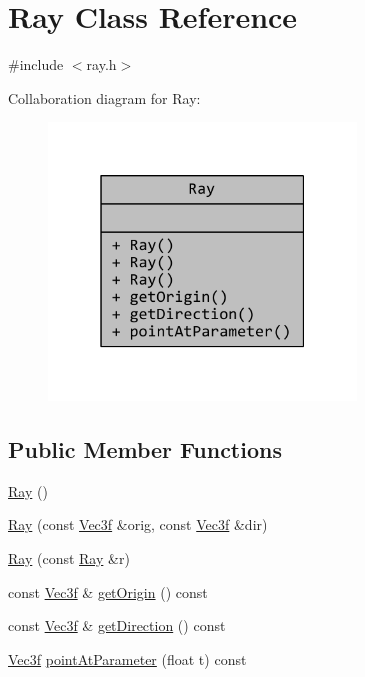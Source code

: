 \hypertarget{classRay}{\section{Ray Class Reference}
\label{classRay}
}


{\ttfamily \#include $<$ray.\+h$>$}



Collaboration diagram for Ray\+:
\nopagebreak
\begin{figure}[H]
\begin{center}
\leavevmode
\includegraphics[width=232pt]{classRay__coll__graph}
\end{center}
\end{figure}
\subsection*{Public Member Functions}
\begin{DoxyCompactItemize}
\item 
\hyperlink{classRay_a2e3d2c29f2df4ab3da10da79d4acb852}{Ray} ()
\item 
\hyperlink{classRay_a3f5131016c3a436018e0f37872e887ed}{Ray} (const \hyperlink{classVec3f}{Vec3f} \&orig, const \hyperlink{classVec3f}{Vec3f} \&dir)
\item 
\hyperlink{classRay_a42a3c560d1a0b25412c220025d4f0a94}{Ray} (const \hyperlink{classRay}{Ray} \&r)
\item 
const \hyperlink{classVec3f}{Vec3f} \& \hyperlink{classRay_ad00358184e1d27e1f92ddb10e6d8c5fb}{get\+Origin} () const 
\item 
const \hyperlink{classVec3f}{Vec3f} \& \hyperlink{classRay_a68698a8b94ab05f42ead9f4a89d320f7}{get\+Direction} () const 
\item 
\hyperlink{classVec3f}{Vec3f} \hyperlink{classRay_a3ddbe6537c2fef2c3c638eda9329d66e}{point\+At\+Parameter} (float t) const 
\end{DoxyCompactItemize}


